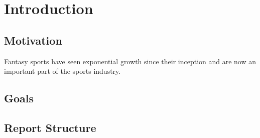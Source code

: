 \chapter{Introduction}

\section{Motivation}
Fantasy sports have seen exponential growth since their inception and are now an important part of the sports industry.

\newpage

\section{Goals}

\section{Report Structure}